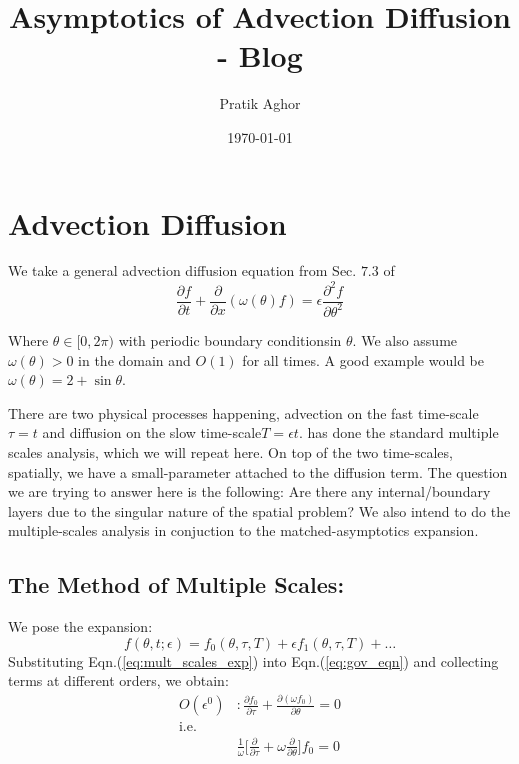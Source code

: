 \documentclass{article}
\title{Asymptotics of Advection Diffusion - Blog}
\author{Pratik Aghor}
\title{}
\date{\today}  %
\newcommand{\del}[1]{\partial{#1}}
\newcommand{\delsq}[1]{\partial^{2}{#1}}
\newcommand{\BCs}{boundary conditions}
\begin{document}
\maketitle
\section*{Advection Diffusion}
We take a general advection diffusion equation from Sec. $7.3$ of \cite{hinch1991perturbation}
\begin{equation}\label{eq:gov_eqn}
   \frac{\del{f}}{\del{t}} + \frac{\del{}}{\del{x}} (\omega(\theta)f)= \epsilon \frac{\delsq{f}}{\del{\theta^{2}}}
\end{equation}

Where $\theta \in [0, 2\pi)$ with periodic \BCs in $\theta$. We also assume $\omega(\theta) > 0$ in the domain and $O(1)$ for all times. A good example would be $\omega(\theta) = 2 + \sin{\theta}$. 

There are two physical processes happening, advection on the fast time-scale $\tau = t$ and diffusion on the slow time-scale$T = \epsilon t$.\cite{hinch1991perturbation} has done the standard multiple scales analysis, which we will repeat here. On top of the two time-scales, spatially, we have a small-parameter attached to the diffusion term. The question we are trying to answer here is the following: Are there any internal/boundary layers due to the singular nature of the spatial problem? We also intend to do the multiple-scales analysis in conjuction to the matched-asymptotics expansion. 
\subsection{The Method of Multiple Scales:}
We pose the expansion:
\begin{equation}\label{eq:mult_scales_exp}
 f(\theta, t; \epsilon) = f_{0}(\theta, \tau, T) + \epsilon f_{1}(\theta, \tau, T) + \ldots
\end{equation}
Substituting Eqn.(\ref{eq:mult_scales_exp}) into Eqn.(\ref{eq:gov_eqn}) and collecting terms at different orders, we obtain:
\begin{subequations}
 \begin{align*}
  O(\epsilon^{0}) &: \frac{\del{f_{0}}}{\del{\tau}} + \frac{\del{(\omega f_{0})}}{\del{\theta} } = 0\\
  \textrm{i.e.}\\
  &\frac{1}{\omega}\bigg[\frac{\del{}}{\del{\tau}} + \omega \frac{\del{}}{\del{\theta}}  \bigg] f_{0} = 0
 \end{align*}
\end{subequations}
\end{document}

